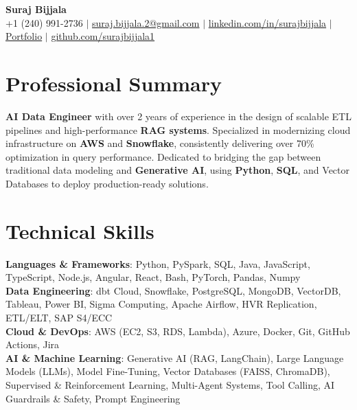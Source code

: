\documentclass[letterpaper,11pt]{article}
\begin{document}
\begin{center}
    \textbf{ \huge Suraj Bijjala} \\ \vspace{2pt}
    \small
    +1 (240) 991-2736 $|$
    \href{mailto:suraj.bijjala.2@gmail.com}{{suraj.bijjala.2@gmail.com}} $|$
    \href{https://www.linkedin.com/in/surajbijjala}{{linkedin.com/in/surajbijjala}} $|$
    \href{https://www.datascienceportfol.io/surajbijjala}{Portfolio} $|$ \href{https://github.com/surajbijjala1}{{github.com/surajbijjala1}}
\end{center}

\vspace{-14pt}

\section{Professional Summary}
\small{
 \textbf{AI Data Engineer} with over 2 years of experience in the design of scalable ETL pipelines and high-performance \textbf{RAG systems}. Specialized in modernizing cloud infrastructure on \textbf{AWS} and \textbf{Snowflake}, consistently delivering over 70\% optimization in query performance. Dedicated to bridging the gap between traditional data modeling and \textbf{Generative AI}, using \textbf{Python}, \textbf{SQL}, and Vector Databases to deploy production-ready solutions.
}
\vspace{-8pt}

\section{Technical Skills}
\small{
\linespread{1.15}\selectfont
 \textbf{Languages \& Frameworks}{: Python, PySpark, SQL, Java, JavaScript, TypeScript, Node.js, Angular, React, Bash, PyTorch, Pandas, Numpy} \\
 \textbf{Data Engineering}{: dbt Cloud, Snowflake, PostgreSQL, MongoDB, VectorDB, Tableau, Power BI, Sigma Computing, Apache Airflow, HVR Replication, ETL/ELT, SAP S4/ECC} \\
 \textbf{Cloud \& DevOps}{: AWS (EC2, S3, RDS, Lambda), Azure, Docker, Git, GitHub Actions, Jira} \\
 \textbf{AI \& Machine Learning}{: Generative AI (RAG, LangChain), Large Language Models (LLMs), Model Fine-Tuning, Vector Databases (FAISS, ChromaDB), Supervised \& Reinforcement Learning, Multi-Agent Systems, Tool Calling, AI Guardrails \& Safety, Prompt Engineering}}
\vspace{-8pt}
\end{document}
